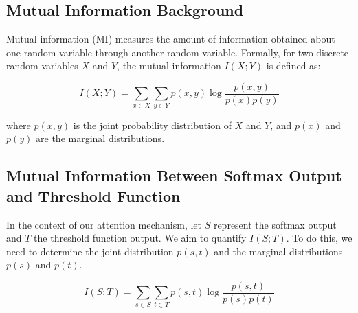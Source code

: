 \subsection{Mutual Information Background}






Mutual information (MI) measures the amount of information obtained about one random variable through another random variable. Formally, for two discrete random variables \(X\) and \(Y\), the mutual information \(I(X; Y)\) is defined as:






\[






I(X; Y) = \sum_{x \in X} \sum_{y \in Y} p(x, y) \log \frac{p(x, y)}{p(x)p(y)}






\]






where \(p(x, y)\) is the joint probability distribution of \(X\) and \(Y\), and \(p(x)\) and \(p(y)\) are the marginal distributions.













\subsection{Mutual Information Between Softmax Output and Threshold Function}






In the context of our attention mechanism, let \(S\) represent the softmax output and \(T\) the threshold function output. We aim to quantify \(I(S; T)\). To do this, we need to determine the joint distribution \(p(s, t)\) and the marginal distributions \(p(s)\) and \(p(t)\).













\begin{equation}






I(S; T) = \sum_{s \in S} \sum_{t \in T} p(s, t) \log \frac{p(s, t)}{p(s)p(t)}






\end{equation}













